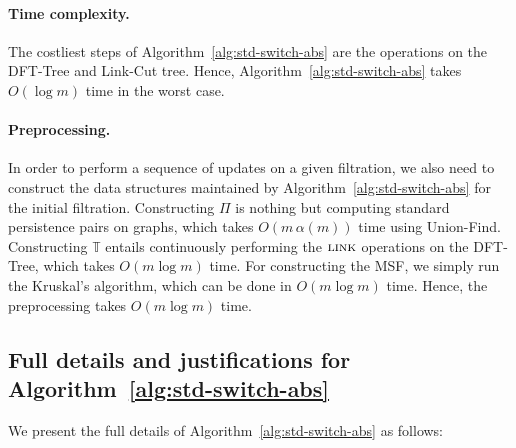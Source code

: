 \documentclass[letterpaper,11pt]{article}
\theoremstyle{mythmstyle}
\theoremstyle{mydefstyle}
\theoremstyle{plain}
\theoremstyle{definition}
\newcommand{\<}[1]{\langle #1\rangle}
\newcommand{\aG}{\alpha}
\newcommand{\Fpo}{\mathbb{T}}
\theoremstyle{definition}
\begin{document}
\paragraph{Time complexity.}
The costliest
steps of Algorithm~\ref{alg:std-switch-abs}
are the operations on the DFT-Tree and Link-Cut tree.
Hence, Algorithm~\ref{alg:std-switch-abs} takes $O(\log m)$ time in the worst case.

\paragraph{Preprocessing.}
In order to perform a sequence of updates on a given filtration,
we also need to construct the data structures maintained by 
Algorithm~\ref{alg:std-switch-abs}
for the initial filtration.
Constructing $\Pi$ is nothing but computing standard persistence pairs on graphs,
which takes $O(m\,\aG(m))$ time using Union-Find.
Constructing $\Fpo$ entails continuously performing the $\textsc{link}$ operations
on the DFT-Tree,
which takes $O(m\log m)$ time.
For constructing the MSF, 
we simply run the Kruskal's algorithm,
which can be done in $O(m\log m)$ time.
Hence, the preprocessing takes $O(m\log m)$ time.










\subsection{Full details and justifications for Algorithm~\ref{alg:std-switch-abs}}
\label{sec:alg-std-switch-full}
We present the full details of Algorithm~\ref{alg:std-switch-abs} as follows:
\end{document}
